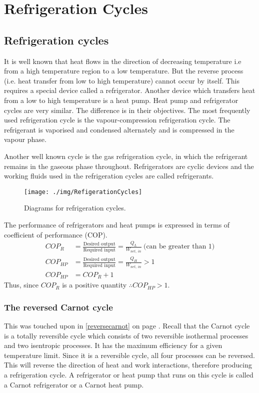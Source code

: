 \chapter{Refrigeration Cycles}
\section{Refrigeration cycles}
It is well known that heat flows in the direction of decreasing temperature i.e from a high temperature region to a low temperature. But the reverse process (i.e. heat transfer from low to high temperature) cannot occur by itself. This requires a special device called a refrigerator. Another device which transfers heat from a low to high temperature is a heat pump. Heat pump and refrigerator cycles are very similar. The difference is in their objectives. The most frequently used refrigeration cycle is the vapour-compression refrigeration cycle. The refrigerant is vaporised and condensed alternately and is compressed in the vapour phase.

Another well known cycle is the gas refrigeration cycle, in which the refrigerant remains in the gaseous phase throughout. Refrigerators are cyclic devices and the working fluids used in the refrigeration cycles are called refrigerants.
\begin{figure}
  \centering
  \texttt{[image: ./img/RefigerationCycles]}
  \caption{Diagrams for refrigeration cycles.}
\end{figure}
The performance of refrigerators and heat pumps is expressed in terms of coefficient of performance (COP).
\begin{align}
  COP_R    & = \frac{\textrm{Desired output}}{\textrm{Required input}} = \frac{Q_L}{W_{net, \ in}} \ \textrm{(can be greater than 1)} \\
  COP_{HP} & = \frac{\textrm{Desired output}}{\textrm{Required input}} = \frac{Q_H}{W_{net, \ in}} > 1                                \\
  COP_{HP} & = COP_R +1
\end{align}
Thus, since $COP_R$ is a positive quantity $\therefore COP_{HP} >1$.
\subsection{The reversed Carnot cycle}
This was touched upon in \ref{reversecarnot} on page \pageref{reversecarnot}. Recall that the Carnot cycle is a totally reversible cycle which consists of two reversible isothermal processes and two isentropic processes. It has the maximum efficiency for a given temperature limit. Since it is a reversible cycle, all four processes can be reversed. This will reverse the direction of heat and work interactions, therefore producing a refrigeration cycle. A refrigerator or heat pump that runs on this cycle is called a Carnot refrigerator or a Carnot heat pump.

